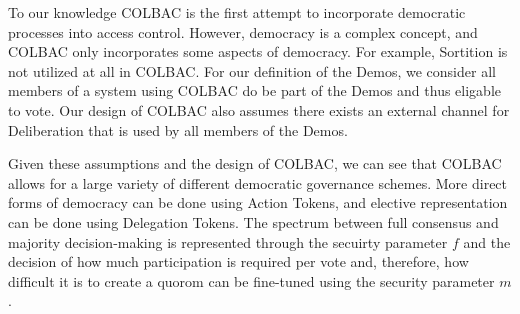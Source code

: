 To our knowledge COLBAC is the first attempt to incorporate democratic processes
into access control. However, democracy is a complex concept, and COLBAC only
incorporates some aspects of democracy. For example, Sortition is not utilized
at all in COLBAC. For our definition of the Demos, we consider all members of
a system using COLBAC do be part of the Demos and thus eligable to vote. Our
design of COLBAC also assumes there exists an external channel for Deliberation
that is used by all members of the Demos.

Given these assumptions and the design of COLBAC, we can see that COLBAC allows
for a large variety of different democratic governance schemes. More direct
forms of democracy can be done using Action Tokens, and elective representation
can be done using Delegation Tokens. The spectrum between full consensus and
majority decision-making is represented through the secuirty parameter $f$ and
the decision of how much participation is required per vote and, therefore, how
difficult it is to create a quorom can be fine-tuned using the security
parameter $m$.
